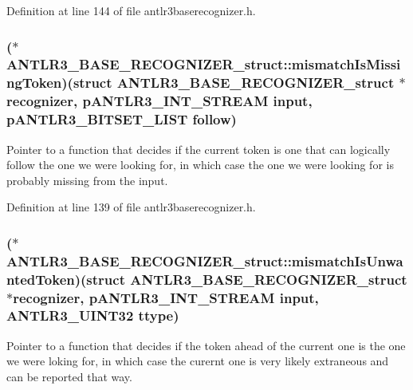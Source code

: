 Definition at line 144 of file antlr3baserecognizer.\-h.

\hypertarget{struct_a_n_t_l_r3___b_a_s_e___r_e_c_o_g_n_i_z_e_r__struct_ac3c7ed8fcb19134f5022d9c002ceb799}{
\subsubsection[{mismatch\-Is\-Missing\-Token}]{($\ast$ A\-N\-T\-L\-R3\-\_\-\-B\-A\-S\-E\-\_\-\-R\-E\-C\-O\-G\-N\-I\-Z\-E\-R\-\_\-struct\-::mismatch\-Is\-Missing\-Token)(struct {\bf A\-N\-T\-L\-R3\-\_\-\-B\-A\-S\-E\-\_\-\-R\-E\-C\-O\-G\-N\-I\-Z\-E\-R\-\_\-struct} $\ast${\bf recognizer}, {\bf p\-A\-N\-T\-L\-R3\-\_\-\-I\-N\-T\-\_\-\-S\-T\-R\-E\-A\-M} input, {\bf p\-A\-N\-T\-L\-R3\-\_\-\-B\-I\-T\-S\-E\-T\-\_\-\-L\-I\-S\-T} {\bf follow})}}\label{struct_a_n_t_l_r3___b_a_s_e___r_e_c_o_g_n_i_z_e_r__struct_ac3c7ed8fcb19134f5022d9c002ceb799}
Pointer to a function that decides if the current token is one that can logically follow the one we were looking for, in which case the one we were looking for is probably missing from the input. 

Definition at line 139 of file antlr3baserecognizer.\-h.

\hypertarget{struct_a_n_t_l_r3___b_a_s_e___r_e_c_o_g_n_i_z_e_r__struct_aecb48ad41d52fb3eded799fc992efe1e}{
\subsubsection[{mismatch\-Is\-Unwanted\-Token}]{($\ast$ A\-N\-T\-L\-R3\-\_\-\-B\-A\-S\-E\-\_\-\-R\-E\-C\-O\-G\-N\-I\-Z\-E\-R\-\_\-struct\-::mismatch\-Is\-Unwanted\-Token)(struct {\bf A\-N\-T\-L\-R3\-\_\-\-B\-A\-S\-E\-\_\-\-R\-E\-C\-O\-G\-N\-I\-Z\-E\-R\-\_\-struct} $\ast${\bf recognizer}, {\bf p\-A\-N\-T\-L\-R3\-\_\-\-I\-N\-T\-\_\-\-S\-T\-R\-E\-A\-M} input, {\bf A\-N\-T\-L\-R3\-\_\-\-U\-I\-N\-T32} ttype)}}\label{struct_a_n_t_l_r3___b_a_s_e___r_e_c_o_g_n_i_z_e_r__struct_aecb48ad41d52fb3eded799fc992efe1e}
Pointer to a function that decides if the token ahead of the current one is the one we were loking for, in which case the curernt one is very likely extraneous and can be reported that way. 


